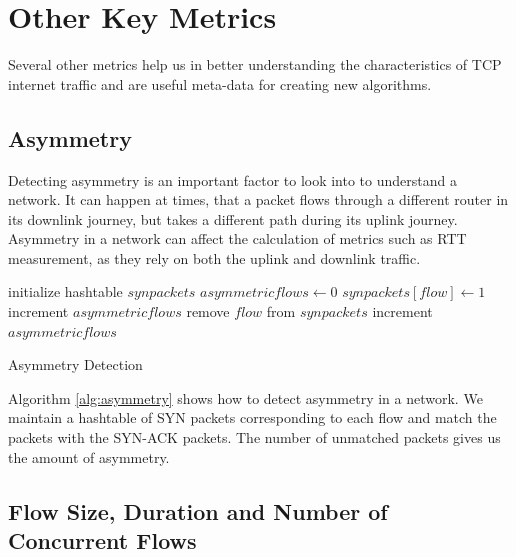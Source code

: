 
\section{Other Key Metrics}

Several other metrics help us in better understanding the characteristics of TCP internet traffic and are useful meta-data for creating new algorithms.

\subsection{Asymmetry}

Detecting asymmetry is an important factor to look into to understand a network. It can happen at times, that a packet flows through a different router in its downlink journey, but takes a different path during its uplink journey. Asymmetry in a network can affect the calculation of metrics such as RTT measurement, as they rely on both the uplink and downlink traffic.

\begin{algorithm}[ttpb]
\bigskip
\begin{algorithmic}
\State initialize hashtable $synpackets$ 
\State $asymmetricflows \gets 0$
        \State $synpackets[flow] \gets 1$
    \EndIf
\EndFor
{}
            \State increment $asymmetricflows$
        \Else
            \State remove $flow$ from $synpackets$
        \EndIf
    \EndIf
\EndFor
{}
    \State increment $asymmetricflows$
\EndFor
\end{algorithmic}
\caption[Asymmetry Detection]{Asymmetry Detection}
\label{alg:asymmetry}
\bigskip
\end{algorithm}

Algorithm \ref{alg:asymmetry} shows how to detect asymmetry in a network. We maintain a hashtable of SYN packets corresponding to each flow and match the packets with the SYN-ACK packets. The number of unmatched packets gives us the amount of asymmetry.

\subsection{Flow Size, Duration and Number of Concurrent Flows}


